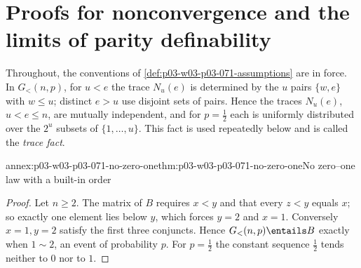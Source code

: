 \section{Proofs for nonconvergence and the limits of parity definability}
\label{sec:annex-p03-w03-p03-071-nonconvergence}

Throughout, the conventions of \cref{def:p03-w03-p03-071-assumptions} are in
force.  In \(G_<(n,p)\), for \(u<e\) the trace \(N_u(e)\) is determined by
the \(u\) pairs \(\{w,e\}\) with \(w\leq u\); distinct \(e>u\) use disjoint
sets of pairs.  Hence the traces \(N_u(e)\), \(u<e\leq n\), are mutually
independent, and for \(p=\frac12\) each is uniformly distributed over the
\(2^u\) subsets of \(\{1,\ldots,u\}\).  This fact is used repeatedly below
and is called the \emph{trace fact}.

\begin{annexitem}{annex:p03-w03-p03-071-no-zero-one}{thm:p03-w03-p03-071-no-zero-one}{No zero--one law with a built-in order}
\begin{proof}
Let \(n\geq2\).  The matrix of \(B\) requires \(x<y\) and that every
\(z<y\) equals \(x\); so exactly one element lies below \(y\), which forces
\(y=2\) and \(x=1\).  Conversely \(x=1,y=2\) satisfy the first three
conjuncts.  Hence \(G_<(n,p)\entails B\) exactly when \(1\sim2\), an event of
probability \(p\).  For \(p=\frac12\) the constant sequence \(\frac12\) tends
neither to \(0\) nor to \(1\).
\end{proof}
\end{annexitem}

